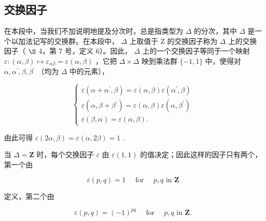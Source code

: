 \subsection{交换因子}

在本段中，当我们不加说明地提及分次时，总是指类型为 \(\Delta\) 的分次，其中 \(\Delta\) 是一个以加法记写的交换群。在本段中， \(\Delta\) 上取值于 Z 的交换因子称为 \(\Delta\) 上的交换因子（ \(\S\) 4，第 7 号，定义 6）。因此， \(\Delta\) 上的一个交换因子等同于一个映射 \(\varepsilon\colon(\alpha,\beta)\mapsto\varepsilon_{\alpha\beta}=\varepsilon(\alpha,\beta)\) ，它把 \(\Delta\times\Delta\) 映到乘法群 \(\{-1,1\}\) 中，使得对 \(\alpha,\alpha^{\prime},\beta,\beta^{\prime}\) （均为 \(\Delta\) 中的元素），

\[
\left\{ \begin{array}{l} \varepsilon (\alpha + \alpha^ {\prime}, \beta) = \varepsilon (\alpha , \beta) \varepsilon (\alpha^ {\prime}, \beta) \\ \varepsilon (\alpha , \beta + \beta^ {\prime}) = \varepsilon (\alpha , \beta) \varepsilon (\alpha , \beta^ {\prime}) \\ \varepsilon (\beta , \alpha) = \varepsilon (\alpha , \beta). \end{array} \right.\tag{1}
\]

由此可得 \(\varepsilon(2\alpha, \beta) = \varepsilon(\alpha, 2\beta) = 1\) .

当 \(\Delta = \mathbf{Z}\) 时，每个交换因子 \(\varepsilon\) 由 \(\varepsilon(1, 1)\) 的值决定；因此这样的因子只有两个，第一个由

\[
\varepsilon (p, q) = 1 \quad \text { for } \quad p, q \text { in } \mathbf {Z}\tag{2}
\]

定义，第二个由

\[
\varepsilon (p, q) = (- 1) ^ {p q} \quad \text { for } \quad p, q \text { in } \mathbf {Z}.\tag{3}
\]

